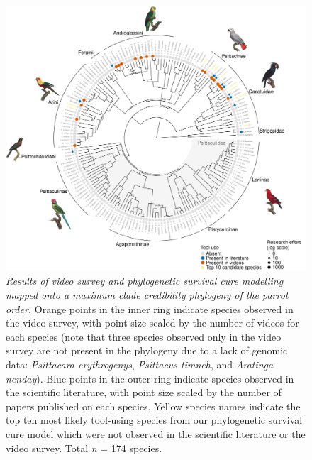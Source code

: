 \documentclass[
  man, donotrepeattitle,floatsintext]{apa6}
\begin{document}
\begin{figure}
\centering
\includegraphics{manuscript_files/figure-latex/plotPhylo1-1.pdf}
\caption{\label{fig:plotPhylo1}\emph{Results of video survey and phylogenetic survival cure
modelling mapped onto a maximum clade credibility phylogeny of the parrot order.}
Orange points in the inner ring indicate species observed in the video survey,
with point size scaled by the number of videos for each species (note that three
species observed only in the video survey are not present in the phylogeny due
to a lack of genomic data: \emph{Psittacara erythrogenys}, \emph{Psittacus timneh}, and
\emph{Aratinga nenday}). Blue points in the outer ring indicate species observed in
the scientific literature, with point size scaled by the number of papers
published on each species. Yellow species names indicate the top ten most likely
tool-using species from our phylogenetic survival cure model which were not
observed in the scientific literature or the video survey. Total \emph{n} =
174 species.}
\end{figure}
\end{document}

